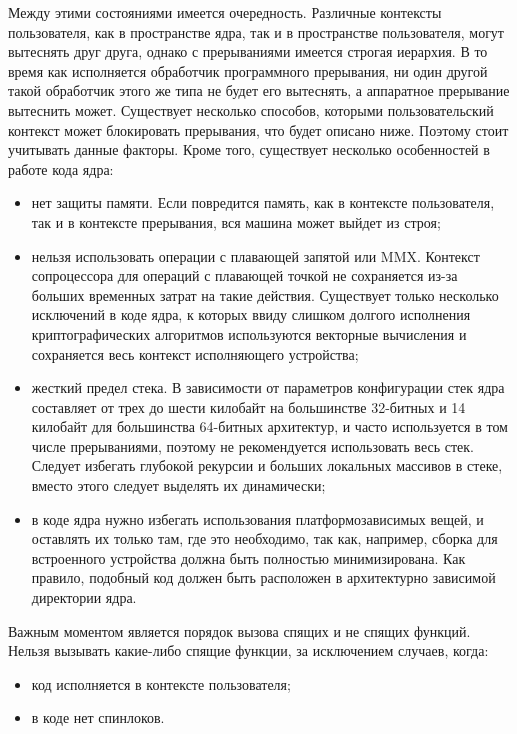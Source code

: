 Между этими состояниями имеется очередность. Различные контексты пользователя,
как в пространстве ядра, так и в пространстве пользователя, могут вытеснять друг
друга, однако с прерываниями имеется строгая иерархия. В то время как
исполняется обработчик программного прерывания, ни один другой такой обработчик
этого же типа не будет его вытеснять, а аппаратное прерывание вытеснить может.
Существует несколько способов, которыми пользовательский контекст может
блокировать прерывания, что будет описано ниже. Поэтому стоит учитывать данные
факторы. Кроме того, существует несколько особенностей в работе кода ядра:
\begin{itemize}
\item нет защиты памяти. Если повредится память, как в контексте пользователя,
  так и в контексте прерывания, вся машина может выйдет из строя;
\item нельзя использовать операции с плавающей запятой или MMX. Контекст
  сопроцессора для операций с плавающей точкой не сохраняется из-за больших
  временных затрат на такие действия. Существует только несколько исключений в
  коде ядра, к которых ввиду слишком долгого исполнения криптографических
  алгоритмов используются векторные вычисления и сохраняется весь контекст
  исполняющего устройства;
\item жесткий предел стека. В зависимости от параметров конфигурации стек ядра
  составляет от трех до шести килобайт на большинстве 32-битных и 14 килобайт
  для большинства 64-битных архитектур, и часто используется в том числе
  прерываниями, поэтому не рекомендуется использовать весь стек. Следует избегать
  глубокой рекурсии и больших локальных массивов в стеке, вместо этого следует
  выделять их динамически;
\item в коде ядра нужно избегать использования платформозависимых вещей, и
  оставлять их только там, где это необходимо, так как, например, сборка для
  встроенного устройства должна быть полностью минимизирована. Как правило,
  подобный код должен быть расположен в архитектурно зависимой директории ядра.
\end{itemize}

Важным моментом является порядок вызова спящих и не спящих функций. Нельзя
вызывать какие-либо спящие функции, за исключением случаев, когда:
\begin{itemize}
\item код исполняется в контексте пользователя;
\item в коде нет спинлоков.
\end{itemize}

